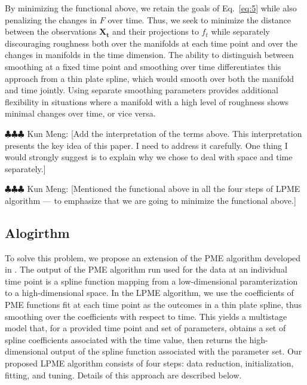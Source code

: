 \documentclass[11pt,reqno]{article}
\newcommand{\commentout}[1]{}
\newcommand{\meng}[1]{{\color{purple} \sf $\clubsuit\clubsuit\clubsuit$ Kun Meng: [#1]}}
\theoremstyle{definition}
\begin{document}
By minimizing the functional above, we retain the goals of Eq.~\eqref{eq:5} while also penalizing the changes in $F$ over time. Thus, we seek to minimize the distance between the observations $\mathbf{X_t}$ and their projections to $f_t$ while separately discouraging roughness both over the manifolds at each time point and over the changes in manifolds in the time dimension. The ability to distinguish between smoothing at a fixed time point and smoothing over time differentiates this approach from a thin plate spline, which would smooth over both the manifold and time jointly. Using separate smoothing parameters provides additional flexibility in situations where a manifold with a high level of roughness shows minimal changes over time, or vice versa.

\meng{Add the interpretation of the terms above. This interpretation presents the key idea of this paper. I need to address it carefully. One thing I would strongly suggest is to explain why we chose to deal with space and time separately.}

\meng{Mentioned the functional above in all the four steps of LPME algorithm --- to emphasize that we are going to minimize the functional above.}

\commentout{Note that we assume changes over time to be smooth. Therefore, we seek a function $f^{*}$ that minimizes $\mathcal{D}_X(f^{*})$ while penalizing both the roughness of the function over the time-independent shape and the changes in the function over time, expressed as }

\subsection{Alogirthm}

To solve this problem, we propose an extension of the PME algorithm developed in \cite{mengPrincipalManifoldEstimation2021}. The output of the PME algorithm run used for the data at an individual time point is a spline function mapping from a low-dimensional paramterization to a high-dimensional space. In the LPME algorithm, we use the coefficients of PME functions fit at each time point as the outcomes in a thin plate spline, thus smoothing over the coefficients with respect to time. This yields a multistage model that, for a provided time point and set of parameters, obtains a set of spline coefficients associated with the time value, then returns the high-dimensional output of the spline function associated with the parameter set. Our proposed LPME algorithm consists of four steps: data reduction, initialization, fitting, and tuning. Details of this approach are described below.
\end{document}
